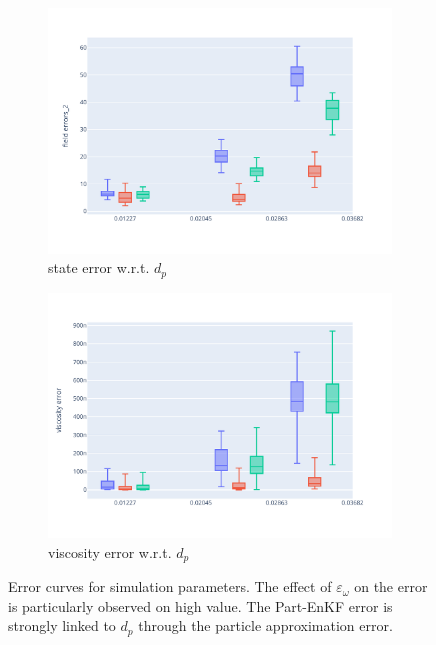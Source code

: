 \begin{figure}[htbp]
\begin{subfigure}{0.48\textwidth}
		\centering
		\includegraphics[width=\linewidth]{./images/app2d/MSE_dp_box.pdf}
		\captionsetup{labelformat=empty}
		\caption{state error w.r.t. $d_p$}
		\label{fig:np_visc}
	\end{subfigure}
	\hfill
	\begin{subfigure}{0.48\textwidth}
		\centering
		\includegraphics[width=\linewidth]{./images/app2d/MSE_visc_dp_box.pdf}
		\captionsetup{labelformat=empty}
		\caption{viscosity error w.r.t. $d_p$}
		\label{fig:np}
	\end{subfigure}
	\caption{Error curves for simulation parameters. The effect of $\varepsilon_{\omega}$ on the error is particularly observed on high value. The Part-EnKF error is strongly linked to $d_p$ through the particle approximation error.}
	\label{fig:simu_parameters_error}
\end{figure}

